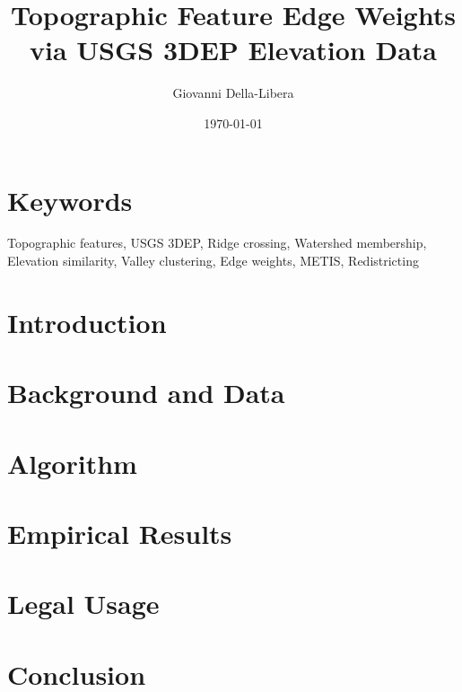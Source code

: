 \documentclass[12pt]{article}
\title{\textbf{Topographic Feature Edge Weights\\
via USGS 3DEP Elevation Data}}
\author{Giovanni Della-Libera}
\date{\today}
\begin{document}
\maketitle

\begin{abstract}

\end{abstract}

\section*{Keywords}
Topographic features, USGS 3DEP, Ridge crossing, Watershed membership,
Elevation similarity, Valley clustering, Edge weights, METIS, Redistricting

\section{Introduction}


\section{Background and Data}


\section{Algorithm}


\section{Empirical Results}


\section{Legal Usage}


\section{Conclusion}




\end{document}
